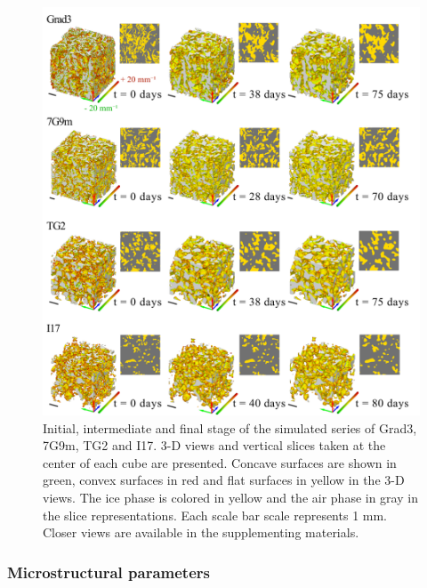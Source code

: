 \documentclass[draft,ms]{agujournal2019}
\begin{document}
\begin{figure}
    \centering
    \includegraphics[width =\linewidth]{Figures/evolution_3D_100122.pdf}
    \caption{Initial, intermediate and final stage of the simulated series of Grad3, 7G9m, TG2 and I17. 3-D views and vertical slices taken at the center of each cube are presented. Concave surfaces are shown in green, convex surfaces in red and flat surfaces in yellow in the 3-D views. The ice phase is colored in yellow and the air phase in gray in the slice representations. Each scale bar scale represents 1 mm. Closer views are available in the supplementing materials.}
    \label{fig:evolutions_3D}
\end{figure}

\subsubsection{Microstructural parameters}
\end{document}
